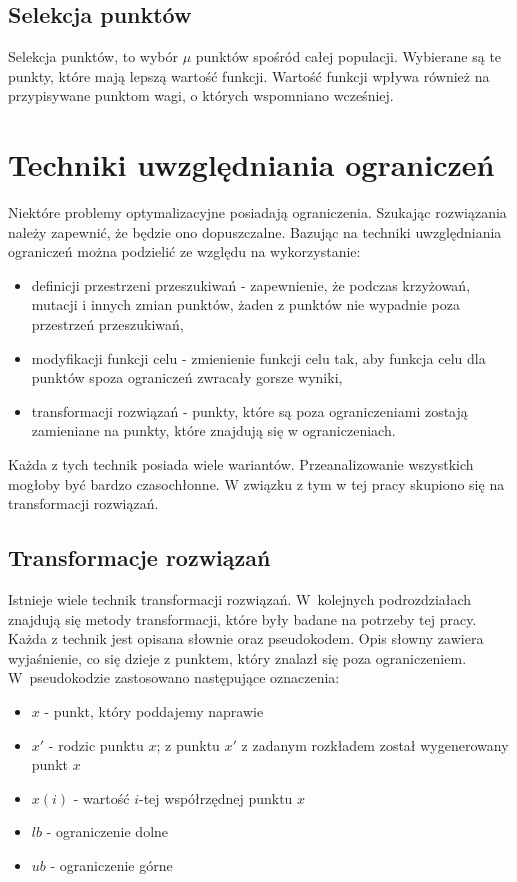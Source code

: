 \documentclass{mini}
\begin{document}
\subsection{Selekcja punktów} \label{selekcjapunktow}
Selekcja punktów, to wybór $\mu$ punktów spośród całej populacji. Wybierane są te punkty, które mają lepszą wartość funkcji. Wartość funkcji wpływa również na przypisywane punktom wagi, o których wspomniano wcześniej.

\pagebreak

\section{Techniki uwzględniania ograniczeń}
Niektóre problemy optymalizacyjne posiadają ograniczenia. Szukając rozwiązania należy zapewnić, że będzie ono dopuszczalne. Bazując na \cite{wyklady} techniki uwzględniania ograniczeń można podzielić ze względu na wykorzystanie:
\begin{itemize}[noitemsep]
\item definicji przestrzeni przeszukiwań - zapewnienie, że podczas krzyżowań, mutacji i innych zmian punktów, żaden z punktów nie wypadnie poza przestrzeń przeszukiwań,
\item modyfikacji funkcji celu - zmienienie funkcji celu tak, aby funkcja celu dla punktów spoza ograniczeń zwracały gorsze wyniki,
\item transformacji rozwiązań - punkty, które są poza ograniczeniami zostają zamieniane na punkty, które znajdują się w ograniczeniach.
\end{itemize}

Każda z tych technik posiada wiele wariantów. Przeanalizowanie wszystkich mogłoby być bardzo czasochłonne. W związku z tym w tej pracy skupiono się na transformacji rozwiązań.

\subsection{Transformacje rozwiązań} \label{transformacje}
Istnieje wiele technik transformacji rozwiązań. W~kolejnych podrozdziałach znajdują się metody transformacji, które były badane na potrzeby tej pracy. Każda z technik jest opisana słownie oraz pseudokodem. Opis słowny zawiera wyjaśnienie, co się dzieje z punktem, który znalazł się poza ograniczeniem. W~pseudokodzie zastosowano następujące oznaczenia:
\begin{itemize}[noitemsep]
\item $x$ - punkt, który poddajemy naprawie
\item $x'$ - rodzic punktu $x$; z punktu $x'$ z zadanym rozkładem został wygenerowany punkt $x$
\item $x(i)$ - wartość $i$-tej współrzędnej punktu $x$
\item $lb$ - ograniczenie dolne
\item $ub$ - ograniczenie górne
\end{itemize}
\end{document}
